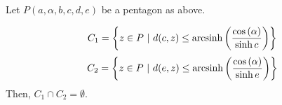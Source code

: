 %
%
%	

\begin{prop}
	\label{prop:quartercollar}
	Let $P(a,\alpha,b,c,d,e)$ be a pentagon as above.
	
	$$C_1 = \left\{z \in P ~ | ~ d(c,z) \leq \textup{arcsinh}\left(\frac{\cos\left(\alpha \right)}{\sinh{c}}\right) \right\}$$
	$$C_2 = \left\{z \in P ~ | ~ d(e,z) \leq \textup{arcsinh}\left(\frac{\cos\left(\alpha \right)}{\sinh{e}}\right) \right\}$$
	Then, $C_1 \cap C_2 = \emptyset$.
\end{prop}

